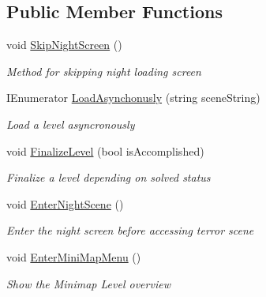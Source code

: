 \subsection*{Public Member Functions}
\begin{DoxyCompactItemize}
\item 
void \mbox{\hyperlink{class_dr_evil_1_1_mechanics_1_1_screen_view_handler_a24540cf0bdc0ebccedd905a7ed53a471}{Skip\+Night\+Screen}} ()
\begin{DoxyCompactList}\small\item\em Method for skipping night loading screen \end{DoxyCompactList}\item 
I\+Enumerator \mbox{\hyperlink{class_dr_evil_1_1_mechanics_1_1_screen_view_handler_a19aa48d532b54e268c6be5288bbbfeaf}{Load\+Asynchonusly}} (string scene\+String)
\begin{DoxyCompactList}\small\item\em Load a level asyncronously \end{DoxyCompactList}\item 
void \mbox{\hyperlink{class_dr_evil_1_1_mechanics_1_1_screen_view_handler_a2e8c60d45fe706fe69b557c4d77625a3}{Finalize\+Level}} (bool is\+Accomplished)
\begin{DoxyCompactList}\small\item\em Finalize a level depending on solved status \end{DoxyCompactList}\item 
void \mbox{\hyperlink{class_dr_evil_1_1_mechanics_1_1_screen_view_handler_a29c4b74c77b7602740c3f90795321bf2}{Enter\+Night\+Scene}} ()
\begin{DoxyCompactList}\small\item\em Enter the night screen before accessing terror scene \end{DoxyCompactList}\item 
void \mbox{\hyperlink{class_dr_evil_1_1_mechanics_1_1_screen_view_handler_a51ae8bed2d6b3baf19756258c6b27b16}{Enter\+Mini\+Map\+Menu}} ()
\begin{DoxyCompactList}\small\item\em Show the Minimap Level overview \end{DoxyCompactList}\end{DoxyCompactItemize}
